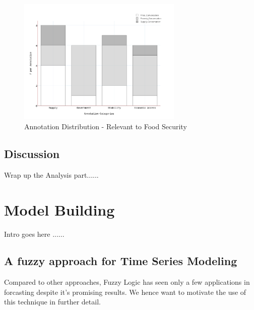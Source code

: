 \begin{figure}[H]
        \centering
         \includegraphics[width=0.7\textwidth ]{img/anal/annotation_dist}
              
        \caption{Annotation Distribution - Relevant to Food Security}
        \label{fig:annotation_dist}
\end{figure}


\section{Discussion}

Wrap up the Analysis part......


\chapter {Model Building}

Intro goes here ......

\section{A fuzzy approach for Time Series Modeling}

Compared to other approaches, Fuzzy Logic has seen only a few applications in forcasting despite it's promising results. We hence want to motivate the use of this technique in further detail. 

